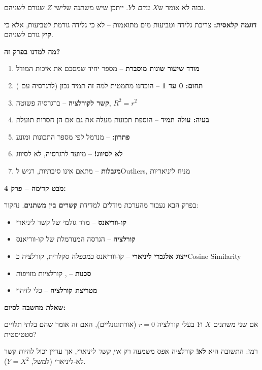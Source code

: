 \Rsquared{} גבוה לא אומר ש\en{-}$X$ \textit{גורם} ל\en{-}$Y$. ייתכן שיש משתנה שלישי $Z$ שגורם לשניהם.

\textbf{דוגמה קלאסית:} צריכת גלידה וטביעות מים מתואמות – לא כי גלידה גורמת לטביעות, אלא כי \textbf{קיץ} גורם לשניהם.


\textbf{מה למדנו בפרק זה?}

\begin{enumerate}
\item \textbf{\Rsquared{} מודד שיעור שונות מוסברת} – מספר יחיד שמסכם את איכות המודל
\item \textbf{תחום: \num{0} עד \num{1}} – הוכחנו מתמטית למה זה תמיד נכון (לרגרסיה עם )
\item \textbf{קשר לקורלציה} – ברגרסיה פשוטה, $R^2 = r^2$
\item \textbf{בעיה: עולה תמיד} – הוספת תכונות מעלה את \Rsquared{} גם אם הן חסרות תועלת
\item \textbf{פתרון: } – מנרמל לפי מספר התכונות ומונע 
\item \textbf{לא לסיווג!} – \Rsquared{} מיועד לרגרסיה, לא לסיווג
\item \textbf{מגבלות} – מתאם אינו סיבתיות, רגיש ל\en{-}Outliers, מניח ליניאריות
\end{enumerate}

\textbf{מבט קדימה – פרק \num{4}:}

בפרק הבא נעבור מהערכת מודלים למדידת \textbf{קשרים בין משתנים}. נחקור:

\begin{itemize}
\item \textbf{קו-ווריאנס}  – מדד גולמי של קשר ליניארי
\item \textbf{קורלציה}  – הגרסה המנורמלת של קו-ווריאנס
\item \textbf{ייצוג אלגברי ליניארי} – קו-ווריאנס כמכפלה סקלרית, קורלציה כ\en{-}Cosine Similarity
\item \textbf{סכנות} – , קורלציות מזויפות
\item \textbf{מטריצת קורלציה} – כלי לזיהוי 
\end{itemize}

\textbf{שאלת מחשבה לסיום:}

אם שני משתנים $X$ ו\en{-}$Y$ בעלי קורלציה $r = \num{0}$ (אורתוגונליים), האם זה אומר שהם בלתי תלויים סטטיסטית?

רמז: התשובה היא \textbf{לא}! קורלציה אפס משמעה רק \textit{אין קשר ליניארי}, אך עדיין יכול להיות קשר לא-ליניארי (למשל, $Y = X^2$).

